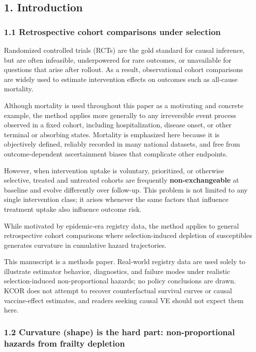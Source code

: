 \documentclass[
]{article}
\begin{document}
\subsection{1. Introduction}\label{introduction}

\subsubsection{1.1 Retrospective cohort comparisons under
selection}\label{retrospective-cohort-comparisons-under-selection}

Randomized controlled trials (RCTs) are the gold standard for causal
inference, but are often infeasible, underpowered for rare outcomes, or
unavailable for questions that arise after rollout. As a result,
observational cohort comparisons are widely used to estimate
intervention effects on outcomes such as all-cause mortality.

Although mortality is used throughout this paper as a motivating and
concrete example, the method applies more generally to any irreversible
event process observed in a fixed cohort, including hospitalization,
disease onset, or other terminal or absorbing states. Mortality is
emphasized here because it is objectively defined, reliably recorded in
many national datasets, and free from outcome-dependent ascertainment
biases that complicate other endpoints.

However, when intervention uptake is voluntary, prioritized, or
otherwise selective, treated and untreated cohorts are frequently
\textbf{non-exchangeable} at baseline and evolve differently over
follow-up. This problem is not limited to any single intervention class;
it arises whenever the same factors that influence treatment uptake also
influence outcome risk.

While motivated by epidemic-era registry data, the method applies to
general retrospective cohort comparisons where selection-induced
depletion of susceptibles generates curvature in cumulative hazard
trajectories.

This manuscript is a methods paper. Real-world registry data are used
solely to illustrate estimator behavior, diagnostics, and failure modes
under realistic selection-induced non-proportional hazards; no policy
conclusions are drawn. KCOR does not attempt to recover counterfactual
survival curves or causal vaccine-effect estimates, and readers seeking
causal VE should not expect them here.

\subsubsection{1.2 Curvature (shape) is the hard part: non-proportional
hazards from frailty
depletion}\label{curvature-shape-is-the-hard-part-non-proportional-hazards-from-frailty-depletion}
\end{document}
